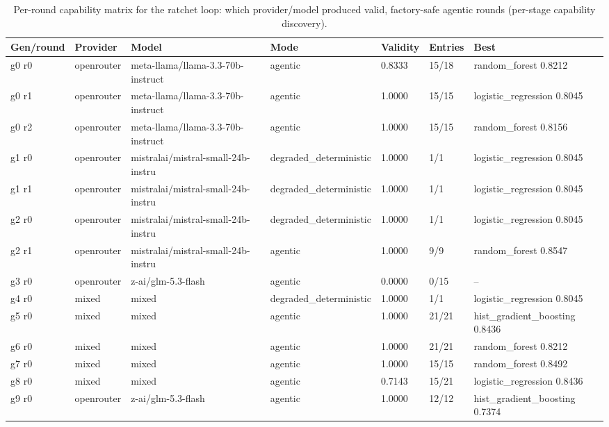 \begin{table}[H]
\centering\small
\caption{Per-round capability matrix for the ratchet loop: which provider/model produced valid, factory-safe agentic rounds (per-stage capability discovery).}
\label{tab:ratchet-rounds-ratchet-ledger-titanic}
\begin{tabular}{lllllll}
\toprule
Gen/round & Provider & Model & Mode & Validity & Entries & Best \\
\midrule
g0 r0 & openrouter & meta-llama/llama-3.3-70b-instruct & agentic & 0.8333 & 15/18 & random\_forest 0.8212 \\
g0 r1 & openrouter & meta-llama/llama-3.3-70b-instruct & agentic & 1.0000 & 15/15 & logistic\_regression 0.8045 \\
g0 r2 & openrouter & meta-llama/llama-3.3-70b-instruct & agentic & 1.0000 & 15/15 & random\_forest 0.8156 \\
g1 r0 & openrouter & mistralai/mistral-small-24b-instru & degraded\_deterministic & 1.0000 & 1/1 & logistic\_regression 0.8045 \\
g1 r1 & openrouter & mistralai/mistral-small-24b-instru & degraded\_deterministic & 1.0000 & 1/1 & logistic\_regression 0.8045 \\
g2 r0 & openrouter & mistralai/mistral-small-24b-instru & degraded\_deterministic & 1.0000 & 1/1 & logistic\_regression 0.8045 \\
g2 r1 & openrouter & mistralai/mistral-small-24b-instru & agentic & 1.0000 & 9/9 & random\_forest 0.8547 \\
g3 r0 & openrouter & z-ai/glm-5.3-flash & agentic & 0.0000 & 0/15 & -- \\
g4 r0 & mixed & mixed & degraded\_deterministic & 1.0000 & 1/1 & logistic\_regression 0.8045 \\
g5 r0 & mixed & mixed & agentic & 1.0000 & 21/21 & hist\_gradient\_boosting 0.8436 \\
g6 r0 & mixed & mixed & agentic & 1.0000 & 21/21 & random\_forest 0.8212 \\
g7 r0 & mixed & mixed & agentic & 1.0000 & 15/15 & random\_forest 0.8492 \\
g8 r0 & mixed & mixed & agentic & 0.7143 & 15/21 & logistic\_regression 0.8436 \\
g9 r0 & openrouter & z-ai/glm-5.3-flash & agentic & 1.0000 & 12/12 & hist\_gradient\_boosting 0.7374 \\
\bottomrule
\end{tabular}
\end{table}

